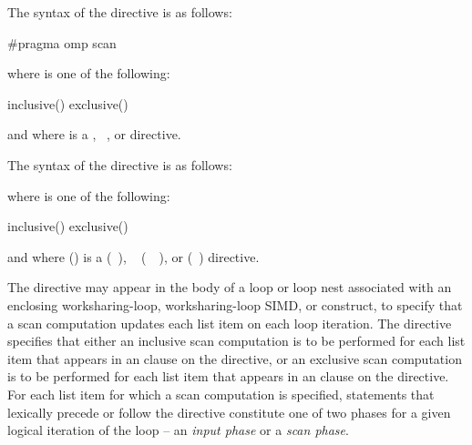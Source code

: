 \begin{samepage}
\syntax
\begin{ccppspecific}
The syntax of the  directive is as follows:

\begin{ompcPragma}
{
   #pragma omp scan  
}
\end{ompcPragma}

where  is one of the following:
\begin{indentedcodelist}
inclusive()
exclusive()
\end{indentedcodelist}

and where  is a , ~, or
 directive.

\end{ccppspecific}
\end{samepage}

\begin{fortranspecific}
The syntax of the  directive is as follows:


where  is one of the following:
\begin{indentedcodelist}
inclusive()
exclusive()
\end{indentedcodelist}

and where  () is 
a  (~), ~ 
(~~), or  (~) directive.
\end{fortranspecific}

\descr
The  directive may appear in the body of a loop or loop nest
associated with an enclosing worksharing-loop, worksharing-loop SIMD, or 
 construct, to specify that a scan computation updates each list
item on each loop iteration. The directive specifies that either an inclusive 
scan computation is to be performed for each list item that appears in an 
 clause on the directive, or an exclusive scan computation 
is to be performed for each list item that appears in an  
clause on the directive.  For each list item for which a scan computation 
is specified, statements that lexically precede or follow the directive 
constitute one of two phases for a given logical iteration of the loop -- 
an \textit{input phase} or a \textit{scan phase}. 

